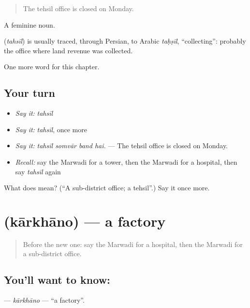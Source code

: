 \begin{quote}
The tehsil office is closed on Monday.
\end{quote}

A feminine noun.

\begin{cousinweb}
\textbf{} (\emph{tahsīl}) is usually traced, through Persian, to Arabic \emph{taḥṣīl}, \textquotedblleft{}collecting\textquotedblright{}: probably the office where land revenue was collected.
\end{cousinweb}

\begin{grammarlens}[title={What you've built}]
One more word for this chapter.
\end{grammarlens}

\subsection*{Your turn}
\begin{itemize}
\raggedright
  \item \emph{Say it:} \emph{tahsīl}
  \item \emph{Say it:} \emph{tahsīl}, once more
  \item \emph{Say it:} \emph{tahsīl somvār band hai.} — The tehsil office is closed on Monday.
  \item \emph{Recall:} say the Marwadi for a tower, then the Marwadi for a hospital, then say \emph{tahsīl} again
\end{itemize}

\begin{tcolorbox}[breakable,colback=teal!4,colframe=teal!35!black,title={Before you move on}]
What does  mean? (\textquotedblleft{}A sub-district office; a tehsil\textquotedblright{}.) Say it once more.
\end{tcolorbox}
\section[\texorpdfstring{\mw{कारखानो} (kārkhāno)}{कारखानो (kārkhāno)}]{ (kārkhāno) — a factory}

\label{lesson:MW-C208-karkhano}



\begin{quote}
Before the new one: say the Marwadi for a hospital, then the Marwadi for a sub-district office.
\end{quote}

\subsection*{You'll want to know: }
\textbf{} — \emph{kārkhāno} — \textquotedblleft{}a factory\textquotedblright{}.

